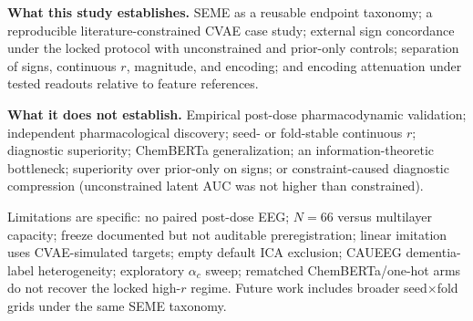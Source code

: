\textbf{What this study establishes.} SEME as a reusable endpoint taxonomy; a reproducible literature-constrained CVAE case study; external sign concordance under the locked protocol with unconstrained and prior-only controls; separation of signs, continuous \(r\), magnitude, and encoding; and encoding attenuation under tested readouts relative to feature references.

\textbf{What it does not establish.} Empirical post-dose pharmacodynamic validation; independent pharmacological discovery; seed- or fold-stable continuous \(r\); diagnostic superiority; ChemBERTa generalization; an information-theoretic bottleneck; superiority over prior-only on signs; or constraint-caused diagnostic compression (unconstrained latent AUC was not higher than constrained).

Limitations are specific: no paired post-dose EEG; \(N=66\) versus multilayer capacity; freeze documented but not auditable preregistration; linear imitation uses CVAE-simulated targets; empty default ICA exclusion; CAUEEG dementia-label heterogeneity; exploratory \(\alpha_c\) sweep; rematched ChemBERTa/one-hot arms do not recover the locked high-\(r\) regime. Future work includes broader seed\(\times\)fold grids under the same SEME taxonomy.
